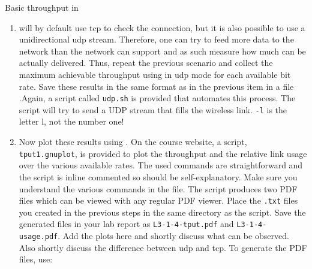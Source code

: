 \begin{exercise}{Basic throughput in }
\begin{enumerate}
		
		\item {} will by default use \ac{tcp} to check the connection, but it is also possible to use a unidirectional \ac{udp} stream. Therefore, one can try to feed more data to the network than the network can support and as such measure how much can be actually delivered. Thus, repeat the previous scenario and collect the maximum achievable throughput using  in \ac{udp} mode for each available bit rate. Save these results in the same format as in the previous item in a file .\newline Again, a script called \texttt{udp.sh} is provided that automates this process. The script will try to send a UDP stream that fills the wireless link.\newline
		\remark \texttt{-l} is the letter l, not the number one!

		\item Now plot these results using . On the course website, a  script, \texttt{tput1.gnuplot}, is provided to plot the throughput and the relative link usage over the various available rates. The used commands are straightforward and the script is inline commented so should be self-explanatory. Make sure you understand the various commands in the file. The script produces two PDF files which can be viewed with any regular PDF viewer. Place the \texttt{.txt} files you created in the previous steps in the same directory as the  script. Save the generated files in your lab report as \texttt{L3-1-4-tput.pdf} and \texttt{L3-1-4-usage.pdf}. Add the plots here and shortly discuss what can be observed. Also shortly discuss the difference between \ac{udp} and \ac{tcp}. To generate the PDF files, use:\newline
		\begin{esolution}
		\end{esolution}
		\end{enumerate}
\end{exercise}

